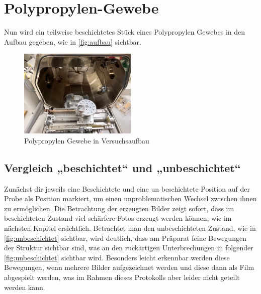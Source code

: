 \documentclass[12pt,english,ngerman]{scrartcl}
\begin{document}
\section{Polypropylen-Gewebe}

Nun wird ein teilweise beschichtetes Stück eines Polypropylen Gewebes in den
Aufbau gegeben, wie in \autoref{fig:aufbau} sichtbar.

\begin{figure}[H]
	\begin{center}
		\includegraphics[width =0.5\textwidth]{./figures/aufbau.png}
	\end{center}
	\caption{Polypropylen Gewebe in Versuchsaufbau
	}\label{fig:aufbau}
\end{figure}

\subsection{Vergleich „beschichtet“ und „unbeschichtet“}

Zunächst dir jeweils eine Beschichtete und eine un beschichtete Position auf
der Probe als Position markiert, um einen unproblematischen Wechsel zwischen
ihnen zu ermöglichen. Die Betrachtung der erzeugten Bilder zeigt sofort, dass
im beschichteten Zustand viel schärfere Fotos erzeugt werden können, wie im
nächsten Kapitel ersichtlich. Betrachtet man den unbeschichteten Zustand, wie
in \autoref{fig:unbeschichtet} sichtbar, wird deutlich, dass am Präparat feine
Bewegungen der Struktur sichtbar sind, was an den ruckartigen Unterbrechungen
in folgender \autoref{fig:unbeschichtet} sichtbar wird. Besonders leicht
erkennbar werden diese Bewegungen, wenn mehrere Bilder aufgezeichnet werden und
diese dann als Film abgespielt werden, was im Rahmen dieses Protokolls aber
leider nicht geteilt werden kann.
\end{document}
